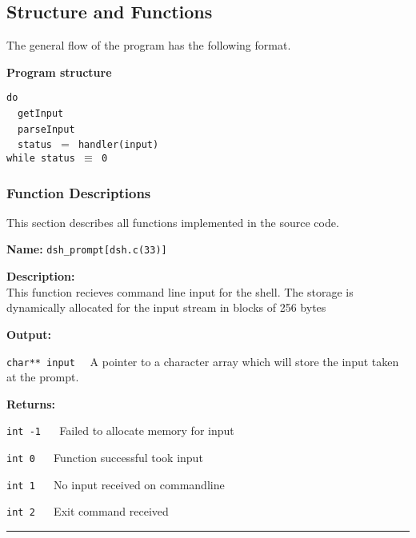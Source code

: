 \documentclass[11pt,a4paper]{article}
\begin{document}
\subsection*{Structure and Functions}

The general flow of the program has the following format.
\begin{description}
\item \textbf{Program structure}

\texttt{do}\\
~~\texttt{getInput}\\
~~\texttt{parseInput}\\
~~\texttt{status $=$ handler(input)}\\
\texttt{while status $\equiv$ 0}

\end{description}

\subsubsection*{Function Descriptions}

This section describes all functions implemented in the source code.\\

\begin{description}
\item \textbf{Name:} 
\verb|dsh_prompt[dsh.c(33)]|

\item \textbf{Description:}\\
This function recieves command line input for the shell.
The storage is dynamically allocated for the input stream in
blocks of 256 bytes

\item \textbf{Output:}
\begin{description}
\item \verb|char** input|~~ A pointer to a character array which will store the input taken at the prompt.
\end{description}

\item \textbf{Returns:}
\begin{description}
\item \verb|int -1| ~~ Failed to allocate memory for input
\item \verb|int 0| ~~ Function successful took input
\item \verb|int 1| ~~ No input received on commandline
\item \verb|int 2| ~~ Exit command received
\end{description}
\end{description}\hrule
\end{document}
